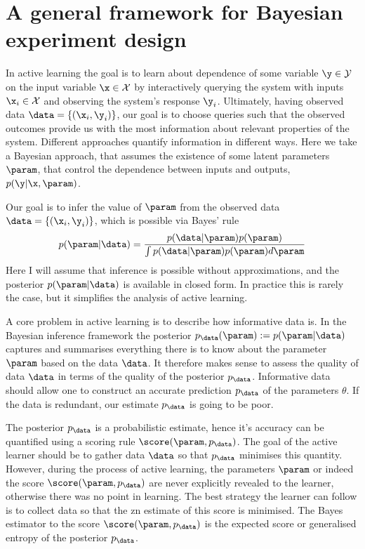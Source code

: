 \section{A general framework for Bayesian experiment design}

In active learning the goal is to learn about dependence of some variable $\y\in\mathcal{Y}$ on the input variable $\x\in\mathcal{X}$ by interactively querying the system with inputs $\x_i\in\mathcal{X}$ and observing the system's response $\y_i$. Ultimately, having observed data $\data = \{(\x_i,\y_i)\}$, our goal is to choose queries such that the observed outcomes provide us with the most information about relevant properties of the system. Different approaches quantify information in different ways. Here we take a Bayesian approach, that assumes the existence of some latent parameters $\param$, that control the dependence between inputs and outputs, $p(\y\vert\x,\param)$.

Our goal is to infer the value of $\param$ from the observed data $\data = \{(\x_i,\y_i)\}$, which is possible via Bayes' rule
\begin{equation}
p(\param\vert\data) = \frac{p(\data\vert\param)p(\param)}{\int p(\data\vert\param)p(\param) d\param}
\end{equation}
Here I will assume that inference is possible without approximations, and the posterior $p(\param\vert\data)$ is available in closed form. In practice this is rarely the case, but it simplifies the analysis of active learning.

A core problem in active learning is to describe how informative data is. In the Bayesian inference framework the posterior $p_\data(\param) := p(\param\vert\data)$ captures and summarises everything there is to know about the parameter $\param$ based on the data $\data$. It therefore makes sense to assess the quality of data $\data$ in terms of the quality of the posterior $p_\data$. Informative data should allow one to construct an accurate prediction $p_\data$ of the parameters $\theta$. If the data is redundant, our estimate $p_\data$ is going to be poor.

The posterior $p_\data$ is a probabilistic estimate, hence it's accuracy can be quantified using a scoring rule $\score(\param,p_\data)$. The goal of the active learner should be to gather data $\data$ so that $p_\data$ minimises this quantity. However, during the process of active learning, the parameters $\param$ or indeed the score $\score(\param,p_\data)$ are never explicitly revealed to the learner, otherwise there was no point in learning. The best strategy the learner can follow is to collect data so that the zn estimate of this score is minimised. The Bayes estimator to the score $\score(\param,p_\data)$ is the expected score or generalised entropy of the posterior $p_\data$.

